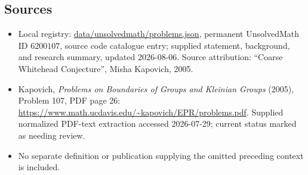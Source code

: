 \documentclass[11pt]{article}
\begin{document}
\subsection{Sources}
\begin{itemize}
\item Local registry: \url{data/unsolvedmath/problems.json}, permanent UnsolvedMath ID \(6200107\), source code catalogue entry; supplied statement, background, and research summary, updated 2026-08-06. Source attribution: ``Coarse Whitehead Conjecture'', Misha Kapovich, 2005.
\item Kapovich, \emph{Problems on Boundaries of Groups and Kleinian Groups} (2005), Problem 107, PDF page 26: \url{https://www.math.ucdavis.edu/~kapovich/EPR/problems.pdf}. Supplied normalized PDF-text extraction accessed 2026-07-29; current status marked as needing review.
\item No separate definition or publication supplying the omitted preceding context is included.
\end{itemize}
\end{document}
